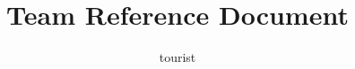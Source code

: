 \documentclass[8pt]{article}
\title{Team Reference Document}
\author{tourist}
\begin{document}
\maketitle
\newpage
\setcounter{page}{1}
\begin{multicols}{2}
    \tableofcontents
    
    
    
    
    
    
    
    
    
\end{multicols}
\end{document}
